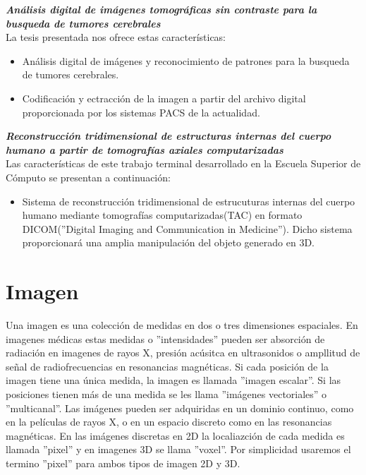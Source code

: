 \documentclass[12pt]{report}
\begin{document}
\hfill\break
\textbf{\textit{Análisis digital de imágenes tomográficas sin contraste para la busqueda de tumores cerebrales}}
\\La tesis presentada nos ofrece estas características:
\begin{itemize}
\item Análisis digital de imágenes y reconocimiento de patrones para la busqueda de tumores cerebrales.
\item Codificación y ectracción de la imagen a partir del archivo digital proporcionada por los sistemas PACS de la actualidad.
\end{itemize}


\hfill\break
\textbf{\textit{Reconstrucción tridimensional de estructuras internas del cuerpo humano a partir de tomografías axiales computarizadas}}
\\Las características de este trabajo terminal desarrollado en la Escuela Superior de Cómputo se presentan a continuación:
\begin{itemize}
\item Sistema de reconstrucción tridimensional de estrucuturas internas del cuerpo humano mediante tomografías computarizadas(TAC) en formato DICOM(''Digital Imaging and Communication in Medicine''). Dicho sistema proporcionará una amplia manipulación del objeto generado en 3D.
\end{itemize}

\section{Imagen}
Una imagen es una colección de medidas en dos o tres dimensiones espaciales. En imagenes médicas estas medidas o ''intensidades'' pueden ser absorción de radiación  en imagenes de rayos X, presión acúsitca en ultrasonidos o ampllitud de señal de radiofrecuencias en resonancias magnéticas. Si cada posición de la imagen tiene una única medida, la imagen es llamada ''imagen escalar''. Si las posiciones tienen más de una medida se les llama ''imágenes vectoriales'' o ''multicanal''. Las imágenes pueden ser adquiridas en un dominio continuo, como en la películas de rayos X, o en un espacio discreto como en las resonancias magnéticas. En las imágenes discretas en 2D la localiazción de cada medida es llamada ''pixel'' y en imagenes 3D se llama ''voxel''. Por simplicidad usaremos el termino ''pixel'' para ambos tipos de imagen 2D y 3D.
\end{document}
